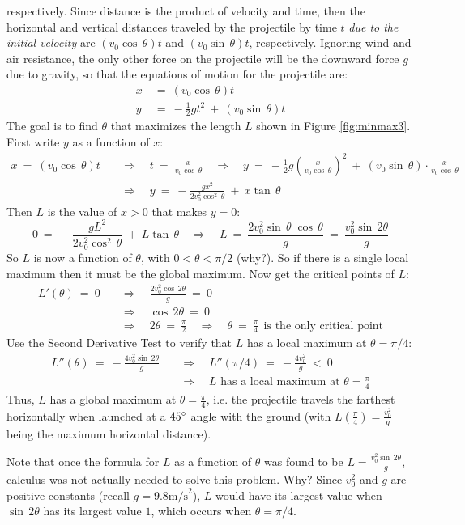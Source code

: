 \begin{exmp}
respectively. Since distance is the product of velocity and time, then the
horizontal and vertical distances traveled by the projectile by time $t$ \emph{due
to the initial velocity} are
$(v_0 \cos\,\theta)t$ and $(v_0 \sin\,\theta)t$, respectively. Ignoring wind and
air resistance, the only other force on the projectile will be the downward force
$g$ due to gravity, so that the equations of motion for the projectile are:
\begin{align*}
 x ~&=~ (v_0 \cos\,\theta)t\\
 y ~&=~ -\frac{1}{2}gt^2 ~+~ (v_0 \sin\,\theta)t
\end{align*}
The goal is to find $\theta$ that maximizes the length $L$ shown in Figure
\ref{fig:minmax3}. First write $y$ as a function of $x$:
\begin{align*}
x ~=~ (v_0 \cos\,\theta)t \quad&\Rightarrow\quad t ~=~ \frac{x}{v_0 \cos\,\theta}
\quad\Rightarrow\quad y ~=~ -\frac{1}{2}g\left(\frac{x}{v_0 \cos\,\theta}\right)^2
 ~+~ (v_0 \sin\,\theta) \cdot \frac{x}{v_0 \cos\,\theta}\\[6pt]
&\Rightarrow\quad y ~=~ -\frac{gx^2}{2v_0^2 \cos^2\,\theta} ~+~ x\tan\,\theta
\end{align*}
Then $L$ is the value of $x>0$ that makes $y=0$:
\[
0 ~=~ -\frac{gL^2}{2v_0^2 \cos^2\,\theta} ~+~ L\tan\,\theta
\quad\Rightarrow\quad L ~=~ \frac{2v_0^2 \sin\,\theta\;\cos\,\theta}{g} ~=~
\frac{v_0^2 \sin\,2\theta}{g}
\]
So $L$ is now a function of $\theta$, with $0 < \theta < \pi/2$ (why?). So if
there is a single local maximum then it must be the global maximum. Now get
the critical points of $L$:
\begin{align*}
L'(\theta) ~=~ 0 \quad&\Rightarrow\quad \frac{2v_0^2 \cos\,2\theta}{g} ~=~ 0\\[4pt]
&\Rightarrow\quad \cos\,2\theta ~=~ 0\\[3pt]
&\Rightarrow\quad 2\theta ~=~ \frac{\pi}{2}
\quad\Rightarrow\quad \theta ~=~ \frac{\pi}{4} ~~\text{is the only critical point}
\end{align*}
Use the Second Derivative Test to verify that $L$ has a local maximum at
$\theta = \pi/4$:
\begin{align*}
L''(\theta) ~=~ -\frac{4v_0^2 \sin\,2\theta}{g}
\quad&\Rightarrow\quad L''(\pi/4) ~=~ -\frac{4v_0^2}{g} ~<~ 0\\[4pt]
&\Rightarrow\quad \text{$L$ has a local maximum at $\theta = \frac{\pi}{4}$}
\end{align*}
Thus, $L$ has a global maximum at $\theta = \frac{\pi}{4}$, i.e. the projectile
travels the farthest horizontally when launched at a $45^\circ$ angle with the
ground (with $L\left(\frac{\pi}{4}\right) = \frac{v_0^2}{g}$ being the maximum
horizontal distance).\vspace{2mm}

\par\noindent Note that once the formula for $L$ as a function of $\theta$ was
found to be $L = \frac{v_0^2 \sin\,2\theta}{g}$, calculus was not actually
needed to solve this problem. Why? Since $v_0^2$ and $g$ are positive
constants (recall $g = 9.8 \text{m/s}^2$), $L$ would have its largest value
when $\sin\,2\theta$ has its largest value $1$, which occurs when
$\theta = \pi/4$.
\end{exmp}
